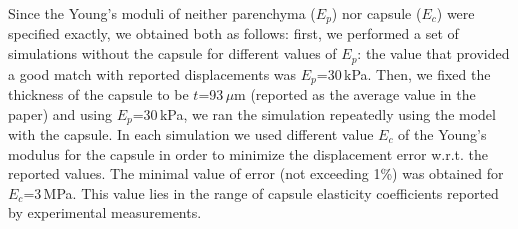 Since the Young's moduli of neither parenchyma ($E_p$) nor capsule ($E_c$) were specified exactly, we obtained both as follows: first, 
we performed a set of simulations without the capsule for different values of $E_p$: the value that provided a good match 
with reported displacements was $E_p$=30\,kPa. 
Then, we fixed the thickness of the capsule to be $t$=93\,$\mu$m (reported as the average value in the paper) and 
using $E_p$=30\,kPa, we ran the simulation repeatedly using the model with the capsule. In each simulation we 
used different value $E_c$ of the Young's modulus for the capsule in order to minimize the displacement error w.r.t. the 
reported values. The minimal value of error (not exceeding 1\%) was obtained for $E_c$=3\,MPa. This 
value lies in the range of capsule elasticity coefficients reported by experimental measurements.



